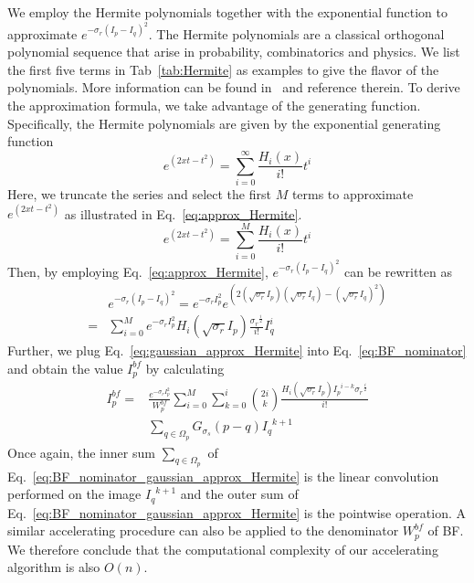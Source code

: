 \documentclass[twocolumn]{el-author}
\begin{document}
We employ the Hermite polynomials together with the exponential function to approximate $e^{-{\sigma_r}{(I_p - I_q)^2}}$. The Hermite polynomials are a classical orthogonal polynomial sequence that arise in probability, combinatorics and physics. We list the first five terms in Tab~\ref{tab:Hermite} as examples to give the flavor of the polynomials. More information can be found in~\cite{Temme_BOOK_1996} and reference therein. To derive the approximation formula, we take advantage of the generating function. Specifically, the Hermite polynomials are given by the exponential generating function
%
\begin{equation}
e^{(2xt-t^2)} = \sum_{i=0}^\infty \frac {H_i(x)}{i!} t^i
\end{equation}
%
Here, we truncate the series and select the first $M$ terms to approximate $e^{(2xt-t^2)}$ as illustrated in Eq.~\eqref{eq:approx_Hermite}.
%
\begin{equation}
e^{(2xt-t^2)} = \sum_{i=0}^M \frac {H_i(x)}{i!} t^i
\label{eq:approx_Hermite}
\end{equation}
%
Then, by employing Eq.~\eqref{eq:approx_Hermite}, $e^{-{\sigma_r}{(I_p - I_q)^2}}$ can be rewritten as
%
\begin{equation}
\begin{split}
& e^{-{\sigma_r}{(I_p - I_q)^2}} = e^{-{\sigma_r}{I_p^2}} e^{(2(\sqrt{\sigma_r} I_p)(\sqrt{\sigma_r} I_q)-(\sqrt{\sigma_r} I_q)^2)} \\
= & \sum_{i=0}^M e^{-{\sigma_r}{I_p^2}} H_i(\sqrt{\sigma_r} I_p) \frac {{\sigma_r}^{\frac{i}{2}}}{i!} I_q^i
\end{split}
\label{eq:gaussian_approx_Hermite}
\end{equation}
%
Further, we plug Eq.~\eqref{eq:gaussian_approx_Hermite} into Eq.~\eqref{eq:BF_nominator} and obtain the value $I_p^{bf}$ by calculating
%
\begin{equation}
\begin{split}
I_p^{bf} = &\frac{e^{-{\sigma_r}{I_p^2}}}{W^{bf}_{p}} \sum_{i=0}^M \sum_{k=0}^{i}  {2i \choose k} \frac { H_i(\sqrt{\sigma_r} I_p) {I_p}^{i-k} {\sigma_r}^{\frac{i}{2}}}{i!} \\
&\sum_{q \in \Omega_p} G_{\sigma_s} (p-q)  {I_q}^{k+1}
\label{eq:BF_nominator_gaussian_approx_Hermite}
\end{split}
\end{equation}
%
Once again, the inner sum $\sum_{q \in \Omega_p}$ of Eq.~\eqref{eq:BF_nominator_gaussian_approx_Hermite} is the linear convolution performed on the image ${I_q}^{k+1}$ and the outer sum of Eq.~\eqref{eq:BF_nominator_gaussian_approx_Hermite} is the pointwise operation. A similar accelerating procedure can also be applied to the denominator $W^{bf}_{p}$ of BF. We therefore conclude that the computational complexity of our accelerating algorithm is also $O(n)$.
\end{document}
